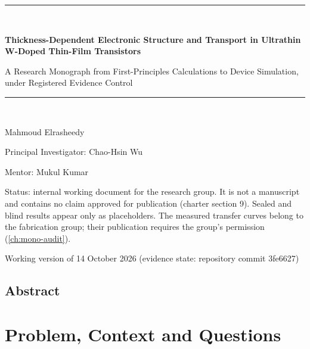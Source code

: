 \documentclass[11pt,oneside,openany]{report}
\newcommand{\reporttitle}{Thickness-Dependent Electronic Structure and Transport in Ultrathin W-Doped \InO{} Thin-Film Transistors}
\newcommand{\reportsubtitle}{A Research Monograph from First-Principles Calculations to Device Simulation, under Registered Evidence Control}
\newcommand{\reportauthor}{Mahmoud Elrasheedy}
\newcommand{\reportsupervisor}{Chao-Hsin Wu}
\newcommand{\reportdate}{Working version of 14 October 2026 (evidence state: repository commit 3fe6627)}
\begin{document}
\begin{titlepage}
  \centering
  \vspace*{2.0cm}
  \rule{\linewidth}{0.6pt}\\[0.8cm]
  {\LARGE\bfseries \reporttitle\par}
  \vspace{0.5cm}
  {\large \reportsubtitle\par}
  \vspace{0.6cm}
  \rule{\linewidth}{0.6pt}\\[1.4cm]
  {\large \reportauthor\par}
  \vspace{0.3cm}
  {\normalsize Principal Investigator: \reportsupervisor\par}
  \vspace{0.2cm}
  {\normalsize Mentor: Mukul Kumar\par}
  \vfill
  {\small Status: internal working document for the research group. It is not a manuscript and contains no claim
  approved for publication (charter section 9). Sealed and blind results appear only as placeholders.
  The measured transfer curves belong to the fabrication group; their publication requires the group's permission
  (\cref{ch:mono-audit}).\par}
  \vspace{0.6cm}
  {\normalsize \reportdate\par}
\end{titlepage}

\chapter*{Abstract}




\tableofcontents
\listoffigures
\listoftables



\cleardoublepage
{}

\part{Problem, Context and Questions}


\clearpage





\end{document}
